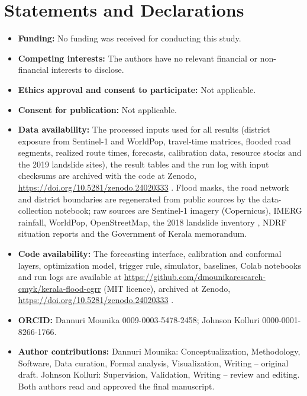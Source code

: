 \documentclass[pdflatex,sn-basic]{sn-jnl}
\theoremstyle{plain}%
\theoremstyle{remark}%
\theoremstyle{definition}%
\begin{document}


\section*{Statements and Declarations}

\begin{itemize}
\item \textbf{Funding:} No funding was received for conducting this study.
\item \textbf{Competing interests:} The authors have no relevant financial or non-financial interests to disclose.
\item \textbf{Ethics approval and consent to participate:} Not applicable.
\item \textbf{Consent for publication:} Not applicable.
\item \textbf{Data availability:} The processed inputs used for all results (district exposure from Sentinel-1 and WorldPop, travel-time matrices, flooded road segments, realized route times, forecasts, calibration data, resource stocks and the 2019 landslide sites), the result tables and the run log with input checksums are archived with the code at Zenodo, \url{https://doi.org/10.5281/zenodo.24020333} \citep{CGRRcode}. Flood masks, the road network and district boundaries are regenerated from public sources by the data-collection notebook; raw sources are Sentinel-1 imagery (Copernicus), IMERG rainfall, WorldPop, OpenStreetMap, the 2018 landslide inventory \citep{Hao2020}, NDRF situation reports and the Government of Kerala memorandum.
\item \textbf{Code availability:} The forecasting interface, calibration and conformal layers, optimization model, trigger rule, simulator, baselines, Colab notebooks and run logs are available at \url{https://github.com/dmounikaresearch-cmyk/kerala-flood-cgrr} (MIT licence), archived at Zenodo, \url{https://doi.org/10.5281/zenodo.24020333} \citep{CGRRcode}.
\item \textbf{ORCID:} Dannuri Mounika 0009-0003-5478-2458; Johnson Kolluri 0000-0001-8266-1766.
\item \textbf{Author contributions:} Dannuri Mounika: Conceptualization, Methodology, Software, Data curation, Formal analysis, Visualization, Writing -- original draft. Johnson Kolluri: Supervision, Validation, Writing -- review and editing. Both authors read and approved the final manuscript.
\end{itemize}
\end{document}

